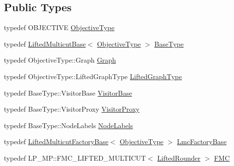 \subsection*{Public Types}
\begin{DoxyCompactItemize}
\item 
typedef O\+B\+J\+E\+C\+T\+I\+V\+E \hyperlink{classnifty_1_1graph_1_1lifted__multicut_1_1LiftedMulticutMp_acce0234d990c40af0002f39dd7e309b7}{Objective\+Type}
\item 
typedef \hyperlink{classnifty_1_1graph_1_1lifted__multicut_1_1LiftedMulticutBase}{Lifted\+Multicut\+Base}$<$ \hyperlink{classnifty_1_1graph_1_1lifted__multicut_1_1LiftedMulticutMp_acce0234d990c40af0002f39dd7e309b7}{Objective\+Type} $>$ \hyperlink{classnifty_1_1graph_1_1lifted__multicut_1_1LiftedMulticutMp_a1970d0f11c6f47d763b4e102a3ea9213}{Base\+Type}
\item 
typedef Objective\+Type\+::\+Graph \hyperlink{classnifty_1_1graph_1_1lifted__multicut_1_1LiftedMulticutMp_acafc07ce6f89254b32d9ca4872d6de15}{Graph}
\item 
typedef Objective\+Type\+::\+Lifted\+Graph\+Type \hyperlink{classnifty_1_1graph_1_1lifted__multicut_1_1LiftedMulticutMp_ac0b728dbc78c20796f66b738b2b6d99f}{Lifted\+Graph\+Type}
\item 
typedef Base\+Type\+::\+Visitor\+Base \hyperlink{classnifty_1_1graph_1_1lifted__multicut_1_1LiftedMulticutMp_aa05a3ad0bdbbfa76ffc49f3bda58d578}{Visitor\+Base}
\item 
typedef Base\+Type\+::\+Visitor\+Proxy \hyperlink{classnifty_1_1graph_1_1lifted__multicut_1_1LiftedMulticutMp_ae6776ff7ee9f8c9767d13d8d5f6435bb}{Visitor\+Proxy}
\item 
typedef Base\+Type\+::\+Node\+Labels \hyperlink{classnifty_1_1graph_1_1lifted__multicut_1_1LiftedMulticutMp_af6da41df53a36b0b01a57035eed36121}{Node\+Labels}
\item 
typedef \hyperlink{classnifty_1_1graph_1_1lifted__multicut_1_1LiftedMulticutFactoryBase}{Lifted\+Multicut\+Factory\+Base}$<$ \hyperlink{classnifty_1_1graph_1_1lifted__multicut_1_1LiftedMulticutMp_acce0234d990c40af0002f39dd7e309b7}{Objective\+Type} $>$ \hyperlink{classnifty_1_1graph_1_1lifted__multicut_1_1LiftedMulticutMp_af71b591afe9d847b241acab738c740c4}{Lmc\+Factory\+Base}
\item 
typedef L\+P\+\_\+\+M\+P\+::\+F\+M\+C\+\_\+\+L\+I\+F\+T\+E\+D\+\_\+\+M\+U\+L\+T\+I\+C\+U\+T$<$ \hyperlink{structnifty_1_1graph_1_1lifted__multicut_1_1LiftedMulticutMp_1_1LiftedRounder}{Lifted\+Rounder} $>$ \hyperlink{classnifty_1_1graph_1_1lifted__multicut_1_1LiftedMulticutMp_a66bb20962d2d51acdfa1ba2e12156b61}{F\+M\+C}

\end{DoxyCompactItemize}
